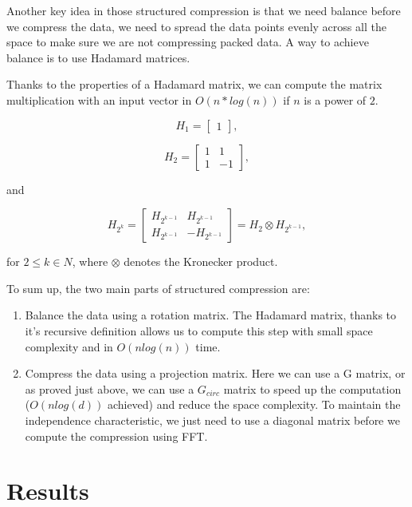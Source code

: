 \documentclass[11pt,a4paper]{article}
\begin{document}
	Another key idea in those structured compression is that we need balance before we compress the data, we need to spread the data points evenly across all the space to make sure we are not compressing packed data. A way to achieve balance is to use Hadamard matrices.
	
	
	
	
	Thanks to the properties of a Hadamard matrix, we can compute the matrix multiplication with an input vector in $O(n*log(n))$ if $n$ is a power of $2$.
	
	
	\[
	H_1 = \begin{bmatrix}
		1      \end{bmatrix},
	\]
	
	\[
	H_2 = \begin{bmatrix}
		1 &  1 \\
		1 & -1 \end{bmatrix},
	\]
	
	and
	
	\[
	H_{2^k} = \begin{bmatrix}
		H_{2^{k-1}} &  H_{2^{k-1}}\\
		H_{2^{k-1}}  & -H_{2^{k-1}}\end{bmatrix} = H_2\otimes H_{2^{k-1}},
	\]
	
	for $ 2 \le k \in N $, where $ \left.\otimes\right. $ denotes the Kronecker product.
	
	
	
	To sum up, the two main parts of structured compression are:
	\begin{enumerate}
		\item Balance the data using a rotation matrix. The Hadamard matrix, thanks to it's recursive definition allows us to compute this step with small space complexity and in $O(nlog(n))$ time.
		\item Compress the data using a projection matrix. Here we can use a G matrix, or as proved just above, we can use a $G_{circ}$ matrix to speed up the computation ($O(nlog(d))$ achieved) and reduce the space complexity. To maintain the independence characteristic, we just need to use a diagonal matrix before we compute the compression using FFT.
	\end{enumerate}

	

	
	
	
	\section{Results}
	
\end{document}
